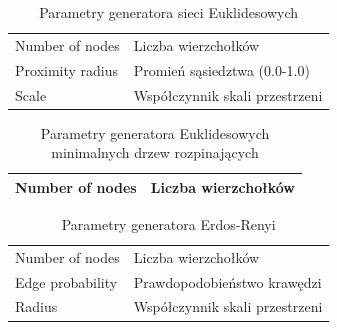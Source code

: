 \documentclass[a4paper,onecolumn,oneside,12pt]{mwart}
\begin{document}
\begin{table}[h!]
	\centering
	\begin{tabular}{p{}p{}}
		\hline
Number of nodes & Liczba wierzchołków \\
Proximity radius & Promień sąsiedztwa (0.0-1.0) \\
Scale & Współczynnik skali przestrzeni \\
		\hline
	\end{tabular}
	\caption{Parametry generatora sieci Euklidesowych}
	\label{tab:params-gen-ecn}
\end{table}

\begin{table}[h!]
	\centering
	\begin{tabular}{p{}p{}}
		\hline
Number of nodes & Liczba wierzchołków \\
		\hline
	\end{tabular}
	\caption{Parametry generatora Euklidesowych minimalnych drzew
	rozpinających}
	\label{tab:params-gen-tree}
\end{table}

\begin{table}[h!]
	\centering
	\begin{tabular}{p{}p{}}
		\hline
Number of nodes & Liczba wierzchołków \\
Edge probability & Prawdopodobieństwo krawędzi \\
Radius & Współczynnik skali przestrzeni \\
		\hline
	\end{tabular}
	\caption{Parametry generatora Erdos-Renyi}
	\label{tab:params-gen-er}
\end{table}
\end{document}
